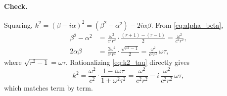 \paragraph{Check.}
Squaring, $k^2 = (\beta - i\alpha)^2 = (\beta^2 - \alpha^2) - 2i\alpha\beta$. From
\cref{eq:alpha_beta},
\begin{align}
  \beta^2 - \alpha^2 &= \frac{\omega^2}{c^2 r^2}\cdot\frac{(r+1)-(r-1)}{2}
                      = \frac{\omega^2}{c^2 r^2}, \\
  2\alpha\beta &= \frac{2\omega^2}{c^2 r^2}\cdot\frac{\sqrt{r^2-1}}{2}
                = \frac{\omega^2}{c^2 r^2}\,\omega\tau,
\end{align}
where $\sqrt{r^2-1} = \omega\tau$. Rationalizing \cref{eq:k2_tau} directly
gives
\begin{equation}
  k^2 = \frac{\omega^2}{c^2}\cdot\frac{1 - i\omega\tau}{1+\omega^2\tau^2}
      = \frac{\omega^2}{c^2 r^2} - i\,\frac{\omega^2}{c^2 r^2}\,\omega\tau,
\end{equation}
which matches term by term.
